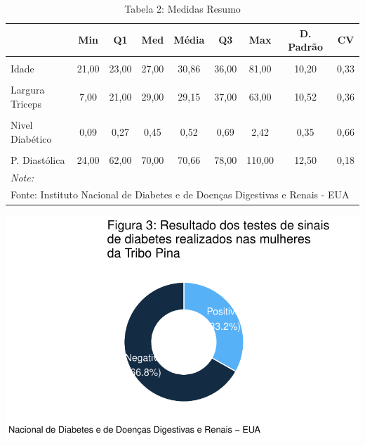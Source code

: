 \documentclass[
  twocolumn,
  landscape]{report}
\begin{document}
\begin{table}

\caption{\label{tab:unnamed-chunk-7}Tabela 2: Medidas Resumo}
\centering
\begin{tabular}[t]{l|c|c|c|c|c|c|c|c}
\hline
  & Min & Q1 & Med & Média & Q3 & Max & D. Padrão & CV\\
\hline
\cellcolor{TRUE}{Glicose} & \cellcolor{TRUE}{56,00} & \cellcolor{TRUE}{99,00} & \cellcolor{TRUE}{119,00} & \cellcolor{TRUE}{122,63} & \cellcolor{TRUE}{143,00} & \cellcolor{TRUE}{198,00} & \cellcolor{TRUE}{30,86} & \cellcolor{TRUE}{0,25}\\
\hline
Idade & 21,00 & 23,00 & 27,00 & 30,86 & 36,00 & 81,00 & 10,20 & 0,33\\
\hline
\cellcolor{TRUE}{IMC} & \cellcolor{TRUE}{18,20} & \cellcolor{TRUE}{28,40} & \cellcolor{TRUE}{33,20} & \cellcolor{TRUE}{33,09} & \cellcolor{TRUE}{37,10} & \cellcolor{TRUE}{67,10} & \cellcolor{TRUE}{7,03} & \cellcolor{TRUE}{0,21}\\
\hline
Largura Triceps & 7,00 & 21,00 & 29,00 & 29,15 & 37,00 & 63,00 & 10,52 & 0,36\\
\hline
\cellcolor{TRUE}{N° de Gestações} & \cellcolor{TRUE}{0,00} & \cellcolor{TRUE}{1,00} & \cellcolor{TRUE}{2,00} & \cellcolor{TRUE}{3,30} & \cellcolor{TRUE}{5,00} & \cellcolor{TRUE}{17,00} & \cellcolor{TRUE}{3,21} & \cellcolor{TRUE}{0,97}\\
\hline
Nivel Diabético & 0,09 & 0,27 & 0,45 & 0,52 & 0,69 & 2,42 & 0,35 & 0,66\\
\hline
\cellcolor{TRUE}{Nível Insulina} & \cellcolor{TRUE}{14,00} & \cellcolor{TRUE}{76,50} & \cellcolor{TRUE}{125,50} & \cellcolor{TRUE}{156,06} & \cellcolor{TRUE}{190,00} & \cellcolor{TRUE}{846,00} & \cellcolor{TRUE}{118,84} & \cellcolor{TRUE}{0,76}\\
\hline
P. Diastólica & 24,00 & 62,00 & 70,00 & 70,66 & 78,00 & 110,00 & 12,50 & 0,18\\
\hline
\multicolumn{9}{l}{\rule{0pt}{1em}\textit{Note: }}\\
\multicolumn{9}{l}{\rule{0pt}{1em}Fonte: Instituto Nacional de Diabetes e de Doenças Digestivas e Renais - EUA}\\
\end{tabular}
\end{table}

\includegraphics{relatorio_lab1_files/figure-pdf/unnamed-chunk-8-1.pdf}
\end{document}

